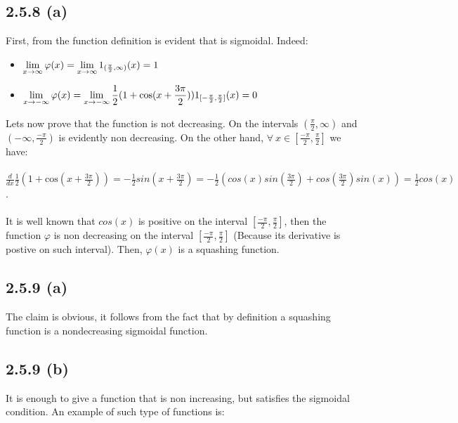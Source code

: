 \documentclass{exam}
\begin{document}
\subsection*{2.5.8 (a)}
 First, from the function definition is evident that is sigmoidal. Indeed:
\begin{itemize}
    \item $\displaystyle\lim_{x \to \infty}\varphi(x) = \lim_{x \to \infty} 1_{\tiny (\frac{\pi}{2}, \infty)}(x) = 1$  
    \item $\displaystyle\lim_{x \to -\infty}\varphi(x) = \lim_{x \to -\infty}\frac{1}{2}(1 + \text{cos}(x + \frac{3\pi}{2}))1_{\tiny [-\frac{\pi}{2}, \frac{\pi}{2}]}(x) = 0$
\end{itemize}
Lets now prove that the function is not decreasing. On the intervals $(\frac{\pi}{2}, \infty)$ and $(-\infty, \frac{-\pi}{2})$ is evidently non decreasing. On the other hand, $\forall \ x \in [\frac{-\pi}{2}, \frac{\pi}{2}]$ we have: \\
\\
$\frac{d}{ d x}\frac{1}{2}(1 + \text{cos}(x + \frac{3\pi}{2})) = - \frac{1}{2}sin(x + \frac{3\pi}{2}) = - \frac{1}{2}(cos(x)sin(\frac{3\pi}{2}) + cos(\frac{3\pi}{2})sin(x)) = \frac{1}{2}cos(x)$. \\
\\
It is well known that $cos(x)$ is positive on the interval $[\frac{-\pi}{2}, \frac{\pi}{2}]$, then the function $\varphi$ is non decreasing on the interval $[\frac{-\pi}{2}, \frac{\pi}{2}]$ (Because its derivative is postive on such interval). Then, $\varphi(x)$ is a squashing function. 

\subsection*{2.5.9 (a)}
The claim is obvious, it follows from the fact that by definition a squashing function is a nondecreasing sigmoidal function. 

\subsection*{2.5.9 (b)}
It is enough to give a function that is non increasing, but satisfies the sigmoidal condition. An example of such type of functions is: 
\end{document}
